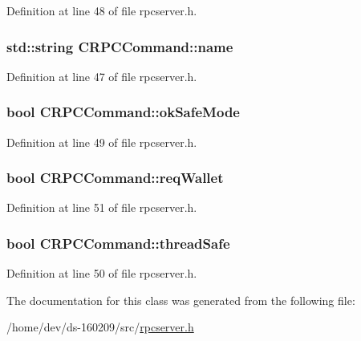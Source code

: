 Definition at line 48 of file rpcserver.\+h.

\hypertarget{class_c_r_p_c_command_a8da584c0d2d98be22ebff74d3cf2221c}{}
\subsubsection[{name}]{\setlength{\rightskip}{0pt plus 5cm}std\+::string C\+R\+P\+C\+Command\+::name}\label{class_c_r_p_c_command_a8da584c0d2d98be22ebff74d3cf2221c}


Definition at line 47 of file rpcserver.\+h.

\hypertarget{class_c_r_p_c_command_a7f0b10e619917a3019f36ba5fa538adb}{}
\subsubsection[{ok\+Safe\+Mode}]{\setlength{\rightskip}{0pt plus 5cm}bool C\+R\+P\+C\+Command\+::ok\+Safe\+Mode}\label{class_c_r_p_c_command_a7f0b10e619917a3019f36ba5fa538adb}


Definition at line 49 of file rpcserver.\+h.

\hypertarget{class_c_r_p_c_command_a15bd6eb3af57f6382f15b2e927fdd445}{}
\subsubsection[{req\+Wallet}]{\setlength{\rightskip}{0pt plus 5cm}bool C\+R\+P\+C\+Command\+::req\+Wallet}\label{class_c_r_p_c_command_a15bd6eb3af57f6382f15b2e927fdd445}


Definition at line 51 of file rpcserver.\+h.

\hypertarget{class_c_r_p_c_command_a0377f0b0f803b3698121f3a2b35d67b1}{}
\subsubsection[{thread\+Safe}]{\setlength{\rightskip}{0pt plus 5cm}bool C\+R\+P\+C\+Command\+::thread\+Safe}\label{class_c_r_p_c_command_a0377f0b0f803b3698121f3a2b35d67b1}


Definition at line 50 of file rpcserver.\+h.



The documentation for this class was generated from the following file\+:\begin{DoxyCompactItemize}
\item 
/home/dev/ds-\/160209/src/\hyperlink{rpcserver_8h}{rpcserver.\+h}\end{DoxyCompactItemize}
